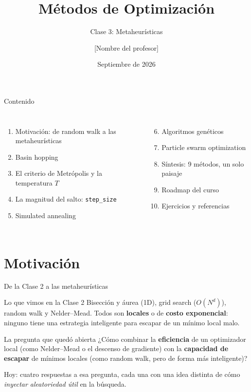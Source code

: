 \documentclass[aspectratio=169,10pt]{beamer}
\title{Métodos de Optimización}
\subtitle{Clase 3: Metaheurísticas}
\author{[Nombre del profesor]}
\institute{Programa de Maestría, [Nombre de la universidad / programa]}
\date{Septiembre de 2026}
\begin{document}
\begin{frame}[plain]
  \maketitle
\end{frame}

\begin{frame}{Contenido}
  \footnotesize
  \begin{columns}[T]
    \begin{enumerate}
      \setcounter{enumi}{0}
      \item Motivación: de random walk a las metaheurísticas
      \item Basin hopping
      \item El criterio de Metrópolis y la temperatura $T$
      \item La magnitud del salto: \texttt{step\_size}
      \item Simulated annealing
    \end{enumerate}
    \begin{enumerate}
      \setcounter{enumi}{5}
      \item Algoritmos genéticos
      \item Particle swarm optimization
      \item Síntesis: 9 métodos, un solo paisaje
      \item Roadmap del curso
      \item Ejercicios y referencias
    \end{enumerate}
  \end{columns}
\end{frame}

\section{Motivación}

\begin{frame}{De la Clase 2 a las metaheurísticas}
  \begin{block}{Lo que vimos en la Clase 2}
    Bisección y áurea (1D), grid search ($O(N^d)$), random walk y
    Nelder--Mead. Todos son \textbf{locales} o de \textbf{costo
    exponencial}: ninguno tiene una estrategia inteligente para escapar
    de un mínimo local malo.
  \end{block}
  \begin{alertblock}{La pregunta que quedó abierta}
    ¿Cómo combinar la \textbf{eficiencia} de un optimizador local (como
    Nelder--Mead o el descenso de gradiente) con la \textbf{capacidad de
    escapar} de mínimos locales (como random walk, pero de forma más
    inteligente)?
  \end{alertblock}
  Hoy: cuatro respuestas a esa pregunta, cada una con una idea distinta
  de cómo \emph{inyectar aleatoriedad útil} en la búsqueda.
\end{frame}
\end{document}
